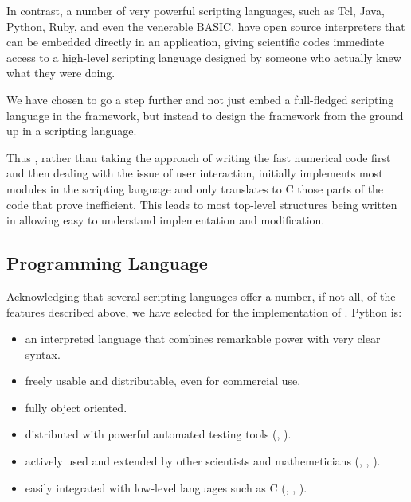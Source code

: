 In contrast, a number of very powerful scripting languages, such as
Tcl, Java, Python, Ruby, and even the venerable BASIC, have open
source interpreters that can be embedded directly in an application,
giving scientific codes immediate access to a high-level scripting
language designed by someone who actually knew what they were doing.

We have chosen to go a step further and not just embed a full-fledged 
scripting language in the \FiPy{} framework, but instead to design the
framework from the ground up in a scripting language.

Thus \FiPy{}, rather than taking the approach of writing the fast
numerical code first and then dealing with the issue of user
interaction, initially implements most modules in the \Python{}
scripting language and only translates to C those parts of the code
that prove inefficient. This leads to most top-level structures being
written in \Python{} allowing easy to understand implementation and
modification. 

\subsection{\Python{} Programming Language}

Acknowledging that several scripting languages offer a number, if not
all, of the features described above, we have selected \Python{} for
the implementation of \FiPy{}.  Python is:

\begin{itemize}
    
    \item an interpreted language that combines remarkable power with very clear
    syntax.
    
    \item freely usable and distributable, even for commercial use.
    
    \item fully object oriented.
    
    \item distributed with powerful automated testing tools (\doctest{}, \unittest{}).

    \item actively used and extended by other scientists and
    mathemeticians (\SciPy{}, \Numeric{}, \PySparse{}).
    
    \item easily integrated with low-level languages such as C
    (\weave{}, \blitz{}, \PyRex{}).
    
\end{itemize}

